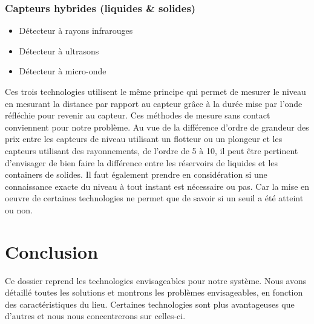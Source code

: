 \subsubsection{Capteurs hybrides (liquides \&  solides)}

\begin{itemize}
\item Détecteur à rayons infrarouges
\item Détecteur à ultrasons
\item Détecteur à micro-onde
\end{itemize}

Ces trois technologies utilisent le même principe qui permet de mesurer le niveau en mesurant la distance par rapport au capteur grâce à la durée mise par l’onde réfléchie pour revenir au capteur. Ces méthodes de mesure sans contact conviennent pour notre problème.
Au vue de la différence d'ordre de grandeur des prix entre les capteurs de niveau utilisant un flotteur ou un plongeur et les capteurs utilisant des rayonnements, de l'ordre de 5 à 10\footnotemark, il peut être pertinent d'envisager de bien faire la différence entre les réservoirs de liquides et les containers de solides. Il faut également prendre en considération si une connaissance exacte du niveau à tout instant est nécessaire ou pas. Car la mise en oeuvre de certaines technologies ne permet que de savoir si un seuil a été atteint ou non.


\section{Conclusion}

Ce dossier reprend les technologies envisageables pour notre système. Nous avons détaillé toutes les solutions et montrons les problèmes envisageables, en fonction des caractéristiques du lieu. Certaines technologies sont plus avantageuses que d'autres et nous nous concentrerons sur celles-ci.



